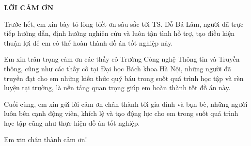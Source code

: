 \documentclass[../DoAn.tex]{subfiles}
\begin{document}
\begin{center}
    \Large{\textbf{LỜI CẢM ƠN}}\\
\end{center}
\vspace{1cm}
Trước hết, em xin bày tỏ lòng biết ơn sâu sắc tới TS. Đỗ Bá Lâm, người đã trực tiếp hướng dẫn, định hướng nghiên cứu và luôn tận tình hỗ trợ, tạo điều kiện thuận lợi để em có thể hoàn thành đồ án tốt nghiệp này.

Em xin trân trọng cảm ơn các thầy cô Trường Công nghệ Thông tin và Truyền thông, cũng như các thầy cô tại Đại học Bách khoa Hà Nội, những người đã truyền đạt cho em những kiến thức quý báu trong suốt quá trình học tập và rèn luyện tại trường, là nền tảng quan trọng giúp em hoàn thành tốt đồ án này.

Cuối cùng, em xin gửi lời cảm ơn chân thành tới gia đình và bạn bè, những người luôn bên cạnh động viên, khích lệ và tạo động lực cho em trong suốt quá trình học tập cũng như thực hiện đồ án tốt nghiệp.

Em xin chân thành cảm ơn!
\end{document}

